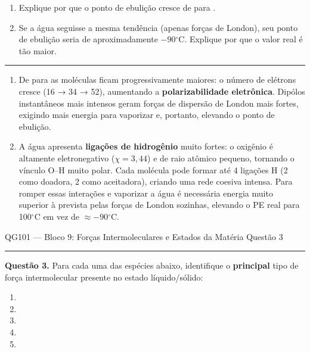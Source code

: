 \documentclass[10pt,a4paper]{article}
\newcommand{\oC}{$^\circ$C}
\newcommand{\questaoheader}[1]{%
  \begin{center}
  {\small\sffamily QG101 --- Bloco 9: Forças Intermoleculares e Estados da Matéria
  \hfill Questão #1}
  \end{center}
  \vspace{-0.3cm}
  \noindent\rule{\textwidth}{0.6pt}
  \vspace{0.1cm}
}
\newcommand{\resolucaosep}{%
  \vspace{0.4cm}
  \noindent\rule{\textwidth}{0.4pt}
  \vspace{0.1cm}

  \noindent{\bf Resolução:}
  \vspace{0.2cm}
}
\begin{document}
\begin{enumerate}
  \item Explique por que o ponto de ebulição cresce de  para
        .
  \item Se a água seguisse a mesma tendência (apenas forças de London),
        seu ponto de ebulição seria de aproximadamente $-90$\oC. Explique
        por que o valor real é tão maior.
\end{enumerate}

\resolucaosep

\begin{enumerate}
  \item De  para  as moléculas ficam progressivamente
        maiores: o número de elétrons cresce (16 → 34 → 52), aumentando a
        \textbf{polarizabilidade eletrônica}. Dipólos instantâneos mais
        intensos geram forças de dispersão de London mais fortes, exigindo
        mais energia para vaporizar e, portanto, elevando o ponto de
        ebulição.

  \item A água apresenta \textbf{ligações de hidrogênio} muito fortes:
        o oxigênio é altamente eletronegativo ($\chi = 3{,}44$) e de raio
        atômico pequeno, tornando o vínculo O--H muito polar. Cada molécula
        pode formar até 4 ligações H (2 como doadora, 2 como aceitadora),
        criando uma rede coesiva intensa. Para romper essas interações e
        vaporizar a água é necessária energia muito superior à prevista
        pelas forças de London sozinhas, elevando o PE real para 100\oC
        em vez de $\approx -90$\oC.
\end{enumerate}

\clearpage

\questaoheader{3}

\noindent\textbf{Questão 3.}
Para cada uma das espécies abaixo, identifique o \textbf{principal} tipo
de força intermolecular presente no estado líquido/sólido:
\begin{enumerate}
  \item {}
  \item {}
  \item {}
  \item {}
  \item {}
\end{enumerate}
\end{document}
